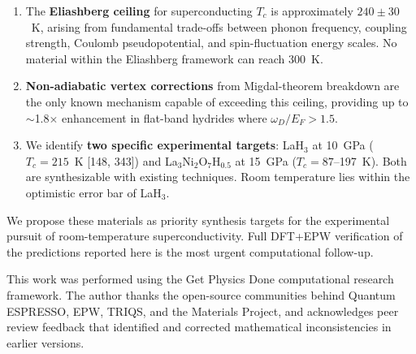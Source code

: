 \documentclass[aps,prb,reprint,superscriptaddress,longbibliography]{revtex4-2}
\begin{document}
\begin{enumerate}
    \item The \textbf{Eliashberg ceiling} for superconducting $T_c$ is approximately $240 \pm 30$~K, arising from fundamental trade-offs between phonon frequency, coupling strength, Coulomb pseudopotential, and spin-fluctuation energy scales. No material within the Eliashberg framework can reach 300~K.

    \item \textbf{Non-adiabatic vertex corrections} from Migdal-theorem breakdown are the only known mechanism capable of exceeding this ceiling, providing up to $\sim$1.8$\times$ enhancement in flat-band hydrides where $\omega_D/E_F > 1.5$.

    \item We identify \textbf{two specific experimental targets}: LaH$_3$ at 10~GPa ($T_c = 215$~K [148, 343]) and La$_3$Ni$_2$O$_7$H$_{0.5}$ at 15~GPa ($T_c = 87$--197~K). Both are synthesizable with existing techniques. Room temperature lies within the optimistic error bar of LaH$_3$.
\end{enumerate}

We propose these materials as priority synthesis targets for the experimental pursuit of room-temperature superconductivity. Full DFT+EPW verification of the predictions reported here is the most urgent computational follow-up.

\begin{acknowledgments}
This work was performed using the Get Physics Done computational research framework. The author thanks the open-source communities behind Quantum ESPRESSO, EPW, TRIQS, and the Materials Project, and acknowledges peer review feedback that identified and corrected mathematical inconsistencies in earlier versions.
\end{acknowledgments}


\end{document}

